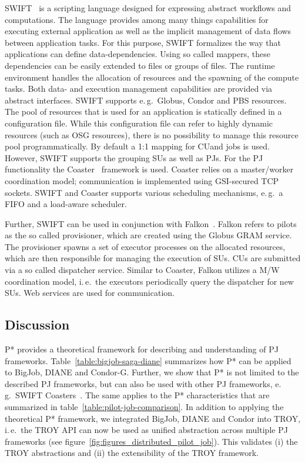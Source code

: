 \documentclass[conference,final]{IEEEtran}
\newcommand{\cu}{CU}
\begin{document}
SWIFT~\cite{Wilde2011} is a scripting language designed for expressing abstract
workflows and computations. The language provides among many things capabilities
for executing external application as well as the implicit management of data
flows between application tasks. For this purpose, SWIFT formalizes the way that
applications can define data-dependencies. Using so called mappers, these
dependencies can be easily extended to files or groups of files. The runtime
environment handles the allocation of resources and the spawning of the compute
tasks. Both data- and execution management capabilities are provided via
abstract interfaces. SWIFT supports e.\,g.\ Globus, Condor and PBS resources.
The pool of resources that is used for an application is statically defined in a
configuration file. While this configuration file can refer to highly dynamic
resources (such as OSG resources), there is no possibility to manage this
resource pool programmatically. By default a 1:1 mapping for \cu and jobs is
used. However, SWIFT supports the grouping SUs as well as PJs. For the PJ
functionality the Coaster~\cite{coasters} framework is used. Coaster relies on a
master/worker coordination model; communication is implemented using GSI-secured
TCP sockets. SWIFT and Coaster supports various scheduling mechanisms, e.\,g.\ 
a FIFO and a load-aware scheduler. 

Further, SWIFT can be used in conjunction with Falkon~\cite{1362680}. Falkon
refers to pilots as the so called provisioner, which are created using the
Globus GRAM service. The provisioner spawns a set of executor processes on the
allocated resources, which are then responsible for managing the execution of
SUs. \cu s are submitted via a so called dispatcher service. Similar to Coaster,
Falkon utilizes a M/W coordination model, i.\,e.\ the executors periodically
query the dispatcher for new SUs. Web services are used for communication.


\subsection{Discussion}



P* provides a theoretical framework for describing and understanding of PJ
frameworks. Table~\ref{table:bigjob-saga-diane} summarizes how P* can be applied
to BigJob, DIANE and Condor-G. Further, we show that P* is not limited to the
described PJ frameworks, but can also be used with other PJ frameworks, e.\,g.\
SWIFT Coasters~\cite{coasters}. The same applies to the P* characteristics 
that
are summarized in table~\ref{table:pilot-job-comparison}. In addition to
applying the theoretical P* framework, we integrated BigJob, DIANE and Condor
into TROY, i.\,e.\ the TROY API can now be used as unified abstraction across
multiple PJ frameworks (see figure~\ref{fig:figures_distributed_pilot_job}).
This validates (i) the TROY abstractions and (ii) the extensibility of the TROY
framework.
\end{document}
